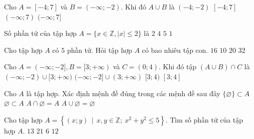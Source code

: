 \begin{ex}%
	Cho $A=[-4;7]$ và $B=(-\infty;-2)$. Khi đó $A\cup B$ là
	\choice
	{$(-4;-2)$}
	{$[-4;7]$}
	{$(-\infty;7)$}
	{\True $(-\infty;7]$}
	\loigiai{Ta có $A\cup B= (-\infty;7] $.}
\end{ex}
\begin{ex}%
	Số phần tử của tập hợp $A=\{x\in\mathbb{Z},|x|\leq 2\}$ là
	\choice
	{$2$}
	{$4$}
	{\True $5$}
	{$1$}
\end{ex}
\begin{ex}%
	Cho tập hợp $A$ có $5$ phần tử. Hỏi tập hợp $A$ có bao nhiêu tập con. 
	\choice
	{$16$}
	{$10$}
	{$20$}
	{\True $32$}
\end{ex}
\begin{ex}%
	Cho $A=(-\infty;-2], B=[3;+\infty)$ và $C=(0;4)$. Khi đó tập $(A\cup B)\cap C$ là
	\choice
	{$(-\infty;-2)\cup[3;+\infty)$}
	{$(-\infty;-2]\cup (3;+\infty)$}
	{\True $[3;4)$}
	{$[3;4]$}
	\loigiai{
		$(A\cup B)=(-\infty;-2]\cup [3;+\infty)$.\\
		Vậy $(A\cup B)\cap C =[3;4)$.
	}
\end{ex}
\begin{ex}%
	Cho $A$ là tập hợp. Xác định mệnh đề đúng trong các mệnh đề sau đây 
	\choice
	{$\{\varnothing\}\subset A$}
	{\True $\varnothing\subset A$}
	{$A\cap\varnothing =A$}
	{$A\cup\varnothing =\varnothing$}
\end{ex}
\begin{ex}%
	Cho tập hợp $A=\left\{(x;y)\,\mid\, x, y \in\mathbb{Z};\ x^2+y^2\leq 5\right\}$. Tìm số phần tử của tập hợp $A$.
	\choice
	{$13$}
	{\True $21$}
	{$6$}
	{$12$}
\end{ex}
